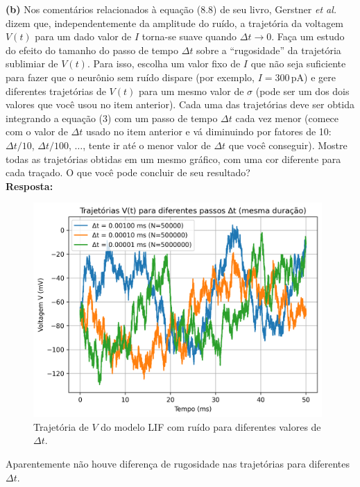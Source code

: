 \documentclass[english,11pt,a4paper]{article}
\begin{document}
	\noindent \textbf{(b)} Nos comentários relacionados à equação (8.8) de seu livro, Gerstner \textit{et al.} dizem que, independentemente da amplitude do ruído, a trajetória da voltagem $V(t)$ para um dado valor de $I$ torna-se suave quando $\Delta t \to 0$. Faça um estudo do efeito do tamanho do passo de tempo $\Delta t$ sobre a “rugosidade” da trajetória sublimiar de $V(t)$. Para isso, escolha um valor fixo de $I$ que não seja suficiente para fazer que o neurônio sem ruído dispare (por exemplo, $I = 300\,\text{pA}$) e gere diferentes trajetórias de $V(t)$ para um mesmo valor de $\sigma$ (pode ser um dos dois valores que você usou no item anterior). Cada uma das trajetórias deve ser obtida integrando a equação (3) com um passo de tempo $\Delta t$ cada vez menor (comece com o valor de $\Delta t$ usado no item anterior e vá diminuindo por fatores de 10: $\Delta t / 10$, $\Delta t / 100$, $\ldots$, tente ir até o menor valor de $\Delta t$ que você conseguir). Mostre todas as trajetórias obtidas em um mesmo gráfico, com uma cor diferente para cada traçado. O que você pode concluir de seu resultado?\\
	
	\noindent\textbf{Resposta:}
	
	\begin{figure}[H]
		\centering
		\includegraphics[width=11cm]{../figures/ex_2b.png}
		\caption{Trajetória de $V$ do modelo LIF com ruído para diferentes valores de $\Delta t$.}
	\end{figure}
	
	Aparentemente não houve diferença de rugosidade nas trajetórias para diferentes $\Delta t$.\\\\
	
\end{document}
